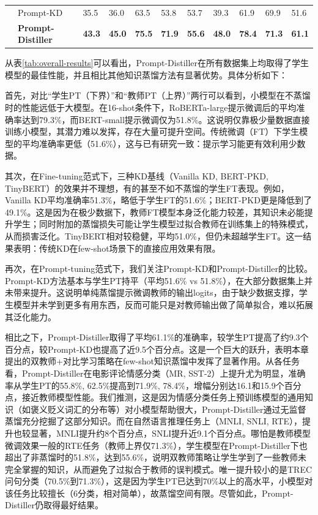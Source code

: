 \documentclass[../main.tex]{subfiles}
\begin{document}
\begin{table}[htbp]
\begin{tabularx}{1\textwidth}{X|l|*{8}{X}|X}
		\cline{2-11}
		            & Prompt-KD                 & 35.5          & 36.0          & 63.5          & 53.8          & 53.7          & 39.3          & 61.9          & 69.9          & 51.6          \\
		\cline{2-11}
		            & \textbf{Prompt-Distiller} & \textbf{43.3} & \textbf{45.0} & \textbf{75.5} & \textbf{71.9} & \textbf{55.6} & \textbf{48.0} & \textbf{78.4} & \textbf{71.3} & \textbf{61.1} \\
		\bottomrule[1pt]
	\end{tabularx}
\end{table}

从表\ref{tab:overall-results}可以看出，Prompt-Distiller在所有数据集上均取得了学生模型的最佳性能，并且相比其他知识蒸馏方法有显著优势。具体分析如下：

首先，对比“学生PT（下界）”和“教师PT（上界）”两行可以看到，小模型在不蒸馏时的性能远低于大模型。在16-shot条件下，RoBERTa-large提示微调后的平均准确率达到79.3\%，而BERT-small提示微调仅为51.8\%。这说明仅靠极少量数据直接训练小模型，其潜力难以发挥，存在大量可提升空间。传统微调（FT）下学生模型的平均准确率更低（51.6\%），这与已有研究一致：提示学习能更有效利用少数据。

其次，在Fine-tuning范式下，三种KD基线（Vanilla KD, BERT-PKD, TinyBERT）的效果并不理想，有的甚至不如不蒸馏的学生FT表现。例如，Vanilla KD平均准确率51.3\%，略低于学生FT的51.6\%；BERT-PKD更是降低到了49.1\%。这是因为在极少数据下，教师FT模型本身泛化能力较差，其知识未必能提升学生；同时附加的蒸馏损失可能让学生模型过拟合教师在训练集上的特殊模式，从而损害泛化。TinyBERT相对较稳健，平均51.0\%，但仍未超越学生FT。这一结果表明：传统KD在few-shot场景下的直接应用效果有限。

再次，在Prompt-tuning范式下，我们关注Prompt-KD和Prompt-Distiller的比较。Prompt-KD方法基本与学生PT持平（平均51.6\% vs 51.8\%），在大部分数据集上并未带来提升。这说明单纯蒸馏提示微调教师的输出logits，由于缺少数据支撑，学生模型并未学到更多有用东西，反而可能只是对教师输出做了简单拟合，难以拓展其泛化能力。

相比之下，Prompt-Distiller取得了平均61.1\%的准确率，较学生PT提高了约9.3个百分点，较Prompt-KD也提高了近9.5个百分点。这是一个巨大的跃升，表明本章提出的双教师+对比学习策略在few-shot知识蒸馏中发挥了显著作用。从各任务看，Prompt-Distiller在电影评论情感分类（MR, SST-2）上提升尤为明显，准确率从学生PT的55.8\%, 62.5\%提高到71.9\%, 78.4\%，增幅分别达16.1和15.9个百分点，接近教师模型性能。我们推测，这是因为情感分类任务上预训练模型的通用知识（如褒义贬义词汇的分布等）对小模型帮助很大，Prompt-Distiller通过无监督蒸馏充分挖掘了这部分知识。而在自然语言推理任务上（MNLI, SNLI, RTE），提升也较显著，MNLI提升约8个百分点，SNLI提升近9.1个百分点。哪怕是教师模型微调效果一般的RTE任务（教师上界仅71.3\%），学生模型在Prompt-Distiller下也超出了非蒸馏时的51.8\%，达到55.6\%，说明双教师策略让学生学到了一些教师未完全掌握的知识，从而避免了过拟合于教师的误判模式。唯一提升较小的是TREC问句分类（70.5\%到71.3\%），这是因为学生PT已达到70\%以上的高水平，小模型对该任务比较擅长（6分类，相对简单），故蒸馏空间有限。尽管如此，Prompt-Distiller仍取得最好结果。
\end{document}

